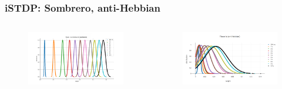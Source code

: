 \documentclass[12pt, aspectratio=169]{beamer}
\begin{document}

\begin{frame}
\frametitle{iSTDP: Sombrero, anti-Hebbian}
\begin{columns}[c] %

\begin{figure}
\includegraphics[width=1\linewidth]{Gauss_Fl_Ia_sombrero}
\end{figure}
\begin{figure}
\includegraphics[width=1\linewidth]{Gauss_Ia_antiHebb}
\end{figure}
\end{columns}
\end{frame}

\end{document}
